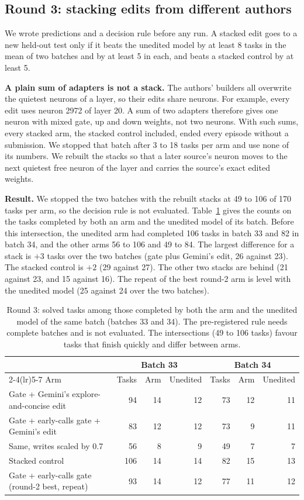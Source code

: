 \subsection{Round 3: stacking edits from different authors}
\label{app:round3}
We wrote predictions and a decision rule before any run. A stacked edit goes to a new held-out test only if it beats the unedited model by at least 8 tasks in the mean of two batches and by at least 5 in each, and beats a stacked control by at least 5.

\textbf{A plain sum of adapters is not a stack.} The authors' builders all overwrite the quietest neurons of a layer, so their edits share neurons. For example, every edit uses neuron 2972 of layer 20. A sum of two adapters therefore gives one neuron with mixed gate, up and down weights, not two neurons. With such sums, every stacked arm, the stacked control included, ended every episode without a submission. We stopped that batch after 3 to 18 tasks per arm and use none of its numbers. We rebuilt the stacks so that a later source's neuron moves to the next quietest free neuron of the layer and carries the source's exact edited weights.

\textbf{Result.} We stopped the two batches with the rebuilt stacks at 49 to 106 of 170 tasks per arm, so the decision rule is not evaluated. Table~\ref{tab:round3} gives the counts on the tasks completed by both an arm and the unedited model of its batch. Before this intersection, the unedited arm had completed 106 tasks in batch 33 and 82 in batch 34, and the other arms 56 to 106 and 49 to 84. The largest difference for a stack is $+3$ tasks over the two batches (gate plus Gemini's edit, 26 against 23). The stacked control is $+2$ (29 against 27). The other two stacks are behind (21 against 23, and 15 against 16). The repeat of the best round-2 arm is level with the unedited model (25 against 24 over the two batches).

\begin{table}[h]
\caption{Round 3: solved tasks among those completed by both the arm and the unedited model of the same batch (batches 33 and 34). The pre-registered rule needs complete batches and is not evaluated. The intersections (49 to 106 tasks) favour tasks that finish quickly and differ between arms.}
\label{tab:round3}
\centering
\small
\begin{tabular}{lrrrrrr}
\toprule
 & \multicolumn{3}{c}{Batch 33} & \multicolumn{3}{c}{Batch 34} \\
\cmidrule(lr){2-4}\cmidrule(lr){5-7}
Arm & Tasks & Arm & Unedited & Tasks & Arm & Unedited \\
\midrule
Gate + Gemini's explore-and-concise edit & 94 & 14 & 12 & 73 & 12 & 11 \\
Gate + early-calls gate + Gemini's edit & 83 & 12 & 12 & 73 & 9 & 11 \\
Same, writes scaled by 0.7 & 56 & 8 & 9 & 49 & 7 & 7 \\
Stacked control & 106 & 14 & 14 & 82 & 15 & 13 \\
Gate + early-calls gate (round-2 best, repeat) & 93 & 14 & 12 & 77 & 11 & 12 \\
\bottomrule
\end{tabular}
\end{table}

